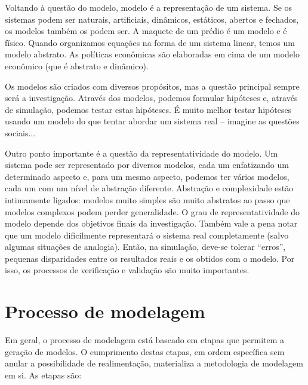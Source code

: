\documentclass[a4paper,12pt,oneside,onecolumn]{uerj}
\begin{document}
Voltando à questão do modelo, modelo é a representação de um sistema. Se os sistemas podem ser naturais, artificiais, dinâmicos, estáticos, abertos e fechados, os modelos também os podem ser. A maquete de um prédio é um modelo e é físico. Quando organizamos equações na forma de um sistema linear, temos um modelo abstrato. As políticas econômicas são elaboradas em cima de um modelo econômico (que é abstrato e dinâmico).

Os modelos são criados com diversos propósitos, mas a questão principal sempre será a investigação. Através dos modelos, podemos formular hipóteses e, através de simulação, podemos testar estas hipóteses. É muito melhor testar hipóteses usando um modelo do que tentar abordar um sistema real -- imagine as questões sociais...

Outro ponto importante é a questão da representatividade do modelo. Um sistema pode ser representado por diversos modelos, cada um enfatizando um determinado aspecto e, para um mesmo aspecto, podemos ter vários modelos, cada um com um nível de abstração diferente. Abstração e complexidade estão intimamente ligados: modelos muito simples são muito abstratos ao passo que modelos complexos podem perder generalidade. O grau de representatividade do modelo depende dos objetivos finais da investigação. Também vale a pena notar que um modelo dificilmente representará o sistema real completamente (salvo algumas situações de analogia). Então, na simulação, deve-se tolerar ``erros'', pequenas disparidades entre os resultados reais e os obtidos com o modelo. Por isso, os processos de verificação e validação são muito importantes.

\section{Processo de modelagem}

Em geral, o processo de modelagem está baseado em etapas que permitem a geração de modelos. O cumprimento destas etapas, em ordem específica sem anular a possibilidade de realimentação, materializa a metodologia de modelagem em si. As etapas são:
\end{document}
